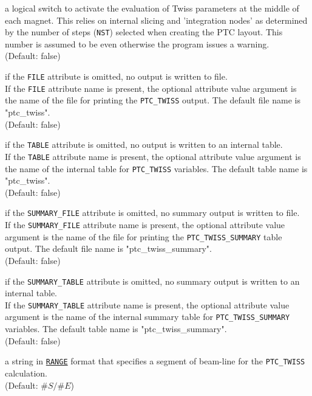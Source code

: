 \begin{madlist}
  a logical switch to activate the evaluation of Twiss
  parameters at the middle of each magnet. This relies on internal slicing
  and 'integration nodes' as determined by the number of steps (\texttt{NST})
  selected when creating the PTC layout. This number is assumed to be even
  otherwise the program issues a warning. \\
  (Default: false)

  if the \texttt{FILE} attribute is omitted, no output is
  written to file. \\ If the \texttt{FILE} attribute name is present, the
  optional attribute value argument is the name of the file for printing
  the \texttt{PTC\_TWISS} output. The default file name is
  "ptc\_twiss". \\ 
  (Default: false)

  if the \texttt{TABLE} attribute is omitted, no output is
  written to an internal table. \\ If the \texttt{TABLE} attribute name is
  present, the optional attribute value argument is the name of the
  internal table for \texttt{PTC\_TWISS} variables. The default table name
  is "ptc\_twiss". \\ 
  (Default: false)

  if the \texttt{SUMMARY\_FILE} attribute is omitted, no summary output is
  written to file. \\  
  If the \texttt{SUMMARY\_FILE} attribute name is present, the optional
  attribute value argument is the name of the file for printing the 
  \texttt{PTC\_TWISS\_SUMMARY} table output. The default file name is
  "ptc\_twiss\_summary". \\
  (Default: false)

  if the \texttt{SUMMARY\_TABLE} attribute is omitted, no summary output is
  written to an internal table. \\ 
  If the \texttt{SUMMARY\_TABLE} attribute name is present, the optional
  attribute value argument is the name of the internal summary table for
  \texttt{PTC\_TWISS\_SUMMARY} variables. The default table name is 
  "ptc\_twiss\_summary".  \\ 
  (Default: false)

  a string in \hyperref[sec:range]{\texttt{RANGE}} format that
  specifies a segment of beam-line for the \texttt{PTC\_TWISS}
  calculation. \\ 
  (Default: $\#S/\#E$)


\end{madlist}
